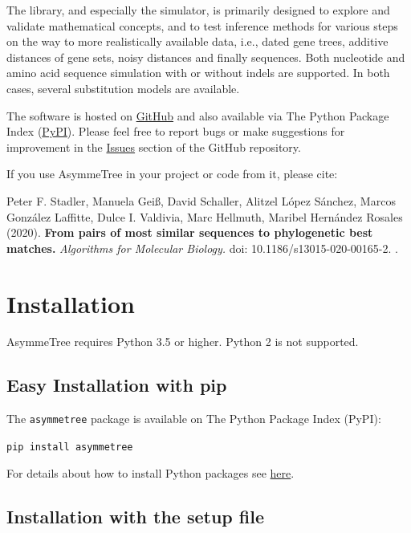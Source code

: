 \documentclass[hidelinks,11pt]{article}
\newcommand{\COMMANDLINE}[1]{\begingroup\par\vspace{3mm}\color{darkgrey}\begin{adjustwidth}{1cm}{1cm}\texttt{#1}\end{adjustwidth}\vspace{3mm}\endgroup}
\begin{document}
The library, and especially the simulator, is primarily designed to explore and
validate mathematical concepts, and to test inference methods for various steps 
on the way to more realistically available data, i.e., dated gene trees, 
additive distances of gene sets, noisy distances and finally sequences.
Both nucleotide and amino acid sequence simulation with or without indels are supported. In both cases, several substitution models are available.

The software is hosted on \href{https://github.com/david-schaller/AsymmeTree}{GitHub} and also available via The Python Package Index (\href{https://pypi.org/project/asymmetree/}{PyPI}).
Please feel free to report bugs or make suggestions for improvement in the \href{https://github.com/david-schaller/AsymmeTree/issues}{Issues} section of the GitHub repository.

If you use AsymmeTree in your project or code from it, please cite:

\vspace{3mm}
\begin{adjustwidth}{1cm}{1cm}
	Peter F. Stadler, Manuela Gei{\ss}, David Schaller, Alitzel L{\'o}pez S{\'a}nchez, Marcos Gonz{\'a}lez Laffitte, Dulce I. Valdivia, Marc Hellmuth, Maribel Hern{\'a}ndez Rosales (2020). \textbf{From pairs of most similar sequences to phylogenetic best matches.} \textit{Algorithms for Molecular Biology.} doi: 10.1186/s13015-020-00165-2. \citep{stadler2020}.
\end{adjustwidth}
\vspace{3mm}


\section{Installation}

AsymmeTree requires Python 3.5 or higher. Python 2 is not supported.

\subsection{Easy Installation with pip}


The \texttt{asymmetree} package is available on The Python Package Index (PyPI):

\COMMANDLINE{pip install asymmetree}

\noindent
For details about how to install Python packages see
\href{https://packaging.python.org/tutorials/installing-packages/}{here}.

\subsection{Installation with the setup file}
\end{document}
